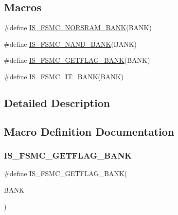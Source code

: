 \subsection*{Macros}
\begin{DoxyCompactItemize}
\item 
\#define \hyperlink{group___f_s_m_c___exported___constants_ga3e3bed3dd83d38e63f11ac4cbcb87304}{I\+S\+\_\+\+F\+S\+M\+C\+\_\+\+N\+O\+R\+S\+R\+A\+M\+\_\+\+B\+A\+NK}(B\+A\+NK)
\item 
\#define \hyperlink{group___f_s_m_c___exported___constants_ga725bada099197f15f49dc0c5be00e19b}{I\+S\+\_\+\+F\+S\+M\+C\+\_\+\+N\+A\+N\+D\+\_\+\+B\+A\+NK}(B\+A\+NK)
\item 
\#define \hyperlink{group___f_s_m_c___exported___constants_ga884e28a365a738ad8a3199ee279a1f77}{I\+S\+\_\+\+F\+S\+M\+C\+\_\+\+G\+E\+T\+F\+L\+A\+G\+\_\+\+B\+A\+NK}(B\+A\+NK)
\item 
\#define \hyperlink{group___f_s_m_c___exported___constants_gaca216ea0c184b78f23df15296a10bac0}{I\+S\+\_\+\+F\+S\+M\+C\+\_\+\+I\+T\+\_\+\+B\+A\+NK}(B\+A\+NK)
\end{DoxyCompactItemize}


\subsection{Detailed Description}


\subsection{Macro Definition Documentation}
\mbox{\label{group___f_s_m_c___exported___constants_ga884e28a365a738ad8a3199ee279a1f77}} 
\subsubsection{\texorpdfstring{I\+S\+\_\+\+F\+S\+M\+C\+\_\+\+G\+E\+T\+F\+L\+A\+G\+\_\+\+B\+A\+NK}{IS\_FSMC\_GETFLAG\_BANK}}
{\footnotesize\ttfamily \#define I\+S\+\_\+\+F\+S\+M\+C\+\_\+\+G\+E\+T\+F\+L\+A\+G\+\_\+\+B\+A\+NK(\begin{DoxyParamCaption}\item[{}]{B\+A\+NK }\end{DoxyParamCaption})}

